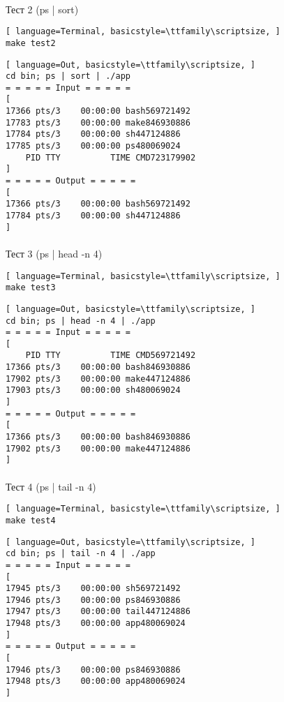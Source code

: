 \paragraph{}
Тест 2 (ps | sort)

\begin{lstlisting}[ language=Terminal, basicstyle=\ttfamily\scriptsize, ]
make test2
\end{lstlisting}

\begin{lstlisting}[ language=Out, basicstyle=\ttfamily\scriptsize, ]
cd bin; ps | sort | ./app
= = = = = Input = = = = =
[
17366 pts/3    00:00:00 bash569721492
17783 pts/3    00:00:00 make846930886
17784 pts/3    00:00:00 sh447124886
17785 pts/3    00:00:00 ps480069024
    PID TTY          TIME CMD723179902
]
= = = = = Output = = = = =
[
17366 pts/3    00:00:00 bash569721492
17784 pts/3    00:00:00 sh447124886
]
\end{lstlisting}

\paragraph{}
Тест 3 (ps | head -n 4)

\begin{lstlisting}[ language=Terminal, basicstyle=\ttfamily\scriptsize, ]
make test3
\end{lstlisting}

\begin{lstlisting}[ language=Out, basicstyle=\ttfamily\scriptsize, ]
cd bin; ps | head -n 4 | ./app
= = = = = Input = = = = =
[
    PID TTY          TIME CMD569721492
17366 pts/3    00:00:00 bash846930886
17902 pts/3    00:00:00 make447124886
17903 pts/3    00:00:00 sh480069024
]
= = = = = Output = = = = =
[
17366 pts/3    00:00:00 bash846930886
17902 pts/3    00:00:00 make447124886
]
\end{lstlisting}

\paragraph{}
Тест 4 (ps | tail -n 4)

\begin{lstlisting}[ language=Terminal, basicstyle=\ttfamily\scriptsize, ]
make test4
\end{lstlisting}

\begin{lstlisting}[ language=Out, basicstyle=\ttfamily\scriptsize, ]
cd bin; ps | tail -n 4 | ./app
= = = = = Input = = = = =
[
17945 pts/3    00:00:00 sh569721492
17946 pts/3    00:00:00 ps846930886
17947 pts/3    00:00:00 tail447124886
17948 pts/3    00:00:00 app480069024
]
= = = = = Output = = = = =
[
17946 pts/3    00:00:00 ps846930886
17948 pts/3    00:00:00 app480069024
]
\end{lstlisting}

